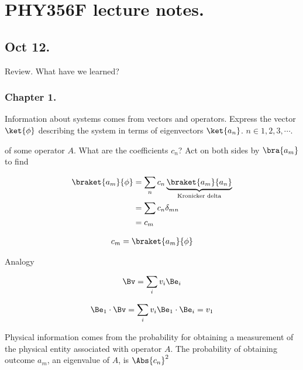 
%

\chapter{PHY356F lecture notes.}
\label{chap:PHY356F}
{}

\beginArtNoToc

\section{Oct 12.}

Review.  What have we learned?

\subsection{Chapter 1.}
Information about systems comes from vectors and operators.  Express the vector $\ket{\phi}$ describing the system in terms of eigenvectors $\ket{a_n}$.  $n \in 1,2,3,\cdots$.

of some operator $A$.  What are the coefficients $c_n$?  Act on both sides by $\bra{a_m}$ to find

\begin{align*}
\braket{a_m}{\phi}
&= \sum_n c_n \underbrace{\braket{a_m}{a_n}}_{\text{Kronicker delta}}  \\
&= \sum c_n \delta_{mn} \\
&= c_m
\end{align*}

\begin{align*}
c_m = \braket{a_m}{\phi}
\end{align*}

Analogy

\begin{align*}
\Bv = \sum_i v_i \Be_i
\end{align*}

\begin{align*}
\Be_1 \cdot \Bv = \sum_i v_i \Be_1 \cdot \Be_i = v_1
\end{align*}

Physical information comes from the probability for obtaining a measurement of the physical entity associated with operator $A$.  The probability of obtaining outcome $a_m$, an eigenvalue of $A$, is $\Abs{c_n}^2$

